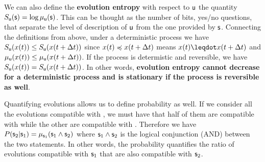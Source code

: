 \documentclass[letterpaper]{article}
\begin{document}
We can also define the \textbf{evolution entropy} with respect to $\stmt[u]$ the quantity $S_{\stmt[u]}(\stmt) = \log \mu_{\stmt[u]}(\stmt)$. This can be thought as the number of bits, yes/no questions, that separate the level of description of $\stmt[u]$ from the one provided by $\stmt$. Connecting the definitions from above, under a deterministic process we have $S_{\stmt[u]}(x(t)) \leq S_{\stmt[u]}(x(t + \Delta t))$ since $x(t)\narrower x(t+\Delta t)$ means $x(t) \finer x(t+\Delta t)$ and $\mu_{\stmt[u]}(x(t)) \leq \mu_{\stmt[u]}(x(t+\Delta t))$. If the process is determistic and reversible, we have $S_{\stmt[u]}(x(t)) = S_{\stmt[u]}(x(t + \Delta t))$. In other words, \textbf{evolution entropy cannot decrease for a deterministic process and is stationary if the process is reversible as well}.

Quantifying evolutions allows us to define probability as well. If we consider all the evolutions compatible with , we must have that half of them are compatible with  while the other are compatible with .  Therefore we have $P(\stmt_2 | \stmt_1) = \mu_{\stmt_1}(\stmt_1 \AND \stmt_2)$ where $\stmt_1 \AND \stmt_2$ is the logical conjunction (AND) between the two statements. In other words, the probability quantifies the ratio of evolutions compatible with $\stmt_1$ that are also compatible with $\stmt_2$.

\end{document}
